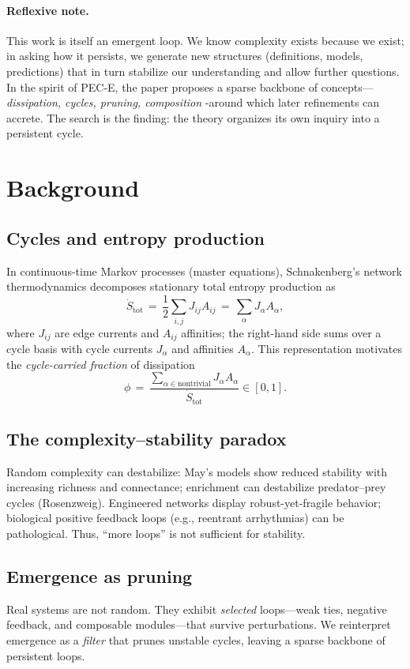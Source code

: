 \documentclass[11pt,a4paper]{article}
\newcommand{\dotS}{\dot S_{\mathrm{tot}}}
\newcommand{\phifrac}{\phi}
\begin{document}
\paragraph{Reflexive note.} This work is itself an emergent loop. We know complexity exists because we exist; in asking how it persists, we generate new structures (definitions, models, predictions) that in turn stabilize our understanding and allow further questions. In the spirit of PEC-E, the paper proposes a sparse backbone of concepts—\emph{dissipation, cycles, pruning, composition} -around which later refinements can accrete. The search is the finding: the theory organizes its own inquiry into a persistent cycle.

\section{Background}
\subsection{Cycles and entropy production}
In continuous-time Markov processes (master equations), Schnakenberg's network thermodynamics decomposes stationary total entropy production as
\begin{equation}
\dotS \,=\, \frac{1}{2}\sum_{i,j} J_{ij} A_{ij} \,=\, \sum_{\alpha} J_{\alpha} A_{\alpha},
\end{equation}
where $J_{ij}$ are edge currents and $A_{ij}$ affinities; the right-hand side sums over a cycle basis with cycle currents $J_{\alpha}$ and affinities $A_{\alpha}$. This representation motivates the \emph{cycle-carried fraction} of dissipation
\begin{equation}
\phifrac \,=\, \frac{\sum_{\alpha\in \text{nontrivial}} J_{\alpha}A_{\alpha}}{\dotS} \in [0,1].
\end{equation}

\subsection{The complexity--stability paradox}
Random complexity can destabilize: May's models show reduced stability with increasing richness and connectance; enrichment can destabilize predator--prey cycles (Rosenzweig). Engineered networks display robust-yet-fragile behavior; biological positive feedback loops (e.g., reentrant arrhythmias) can be pathological. Thus, ``more loops'' is not sufficient for stability.

\subsection{Emergence as pruning}
Real systems are not random. They exhibit \emph{selected} loops---weak ties, negative feedback, and composable modules---that survive perturbations. We reinterpret emergence as a \emph{filter} that prunes unstable cycles, leaving a sparse backbone of persistent loops.
\end{document}
